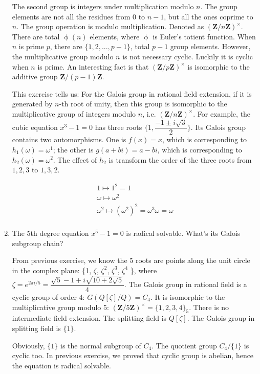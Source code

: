 \documentclass[UTF8]{article}
\begin{document}
\begin{enumerate}
\begin{mdframed}
\vspace{5mm}

The second group is integers under multiplication modulo $n$. The group elements are not all the residues from 0 to $n-1$, but all the ones coprime to $n$. The group operation is modulo multiplication. Denoted as $(\pmb{Z}/n\pmb{Z})^{\times}$. There are total $\upphi(n)$ elements, where $\upphi$ is Euler's totient function. When $n$ is prime $p$, there are $\{1, 2, ..., p-1\}$, total $p-1$ group elements. However, the multiplicative group modulo $n$ is not necessary cyclic. Luckily it is cyclic when $n$ is prime. An interesting fact is that $(\pmb{Z}/p\pmb{Z})^{\times}$ is isomorphic to the additive group $\pmb{Z}/(p-1)\pmb{Z}$.

\vspace{5mm}

This exercise tells us: For the Galois group in rational field extension, if it is generated by $n$-th root of unity, then this group is isomorphic to the multiplicative group of integers modulo $n$, i.e. $(\pmb{Z}/n\pmb{Z})^{\times}$. For example, the cubic equation $x^3 -1 = 0$ has three roots $\{1, \dfrac{-1 \pm i \sqrt{3}}{2}\}$. Its Galois group contains two automorphisms. One is $f(x) = x$, which is corresponding to $h_1(\omega) = \omega^1$; the other is $g(a + bi) = a - bi$, which is corresponding to $h_2(\omega) = \omega^2$. The effect of $h_2$ is transform the order of the three roots from $1, 2, 3$ to $1, 3, 2$.

\[
\begin{array}{l}
1 \mapsto 1^2 = 1 \\
\omega \mapsto \omega^2 \\
\omega^2 \mapsto (\omega^2)^2 = \omega^3 \omega = \omega \\
\end{array}
\]

\end{mdframed}

\item {The 5th degree equation $x^5 - 1 = 0$ is radical solvable. What's its Galois subgroup chain?}

From previous exercise, we know the 5 roots are points along the unit circle in the complex plane: \{1, $\zeta$, $\zeta^2$, $\zeta^3$, $\zeta^4$ \}, where $\zeta = e^{2 \pi i / 5} = \dfrac{\sqrt{5} - 1 + i\sqrt{10 + 2 \sqrt{5}}}{4}$. The Galois group in rational field is a cyclic group of order 4: $G(Q[\zeta]/Q) = C_4$. It is isomorphic to the multiplicative group modulo 5: $(\pmb{Z}/5\pmb{Z})^{\times} = \{1, 2, 3, 4 \}_5$. There is no intermediate field extension. The splitting field is $Q[\zeta]$. The Galois group in splitting field is $\{1\}$.

Obviously, $\{1\}$ is the normal subgroup of $C_4$. The quotient group $C_4/\{1\}$ is cyclic too. In previous exercise, we proved that cyclic group is abelian, hence the equation is radical solvable.

\end{enumerate}
\end{document}
